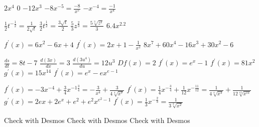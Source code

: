 \begin{Answer}[ref={exStandardDerivatives}]
	\Question %
\begin{tasks}
	\task $2 x^{4}$
	\task $0$
	\task $ -12 x^{3}$
	\task $ -8 x^{ -5} =\frac{ -8}{x^{5}}$
	\task $ -x^{ -4} =\frac{ -1}{x^{4}}$
\end{tasks}

\Question %
\begin{tasks}
	\task $\frac{1}{2} t^{ -\frac{1}{2}} =\frac{1}{2 \sqrt{t}}$
	\task $\frac{3}{2} t^{\frac{1}{2}} =\frac{3 \sqrt{t}}{2}$
	\task $\frac{5}{3} z^{\frac{2}{3}} =\frac{5 \sqrt[{3}]{z^{2}}}{3}$
	\task $6.4 x^{2.2}$ 
\end{tasks}

\Question %
\begin{tasks}
	\task $f^{ \prime } \left (x\right ) =6 x^{2} -6 x +4$
	\task $f^{ \prime } \left (x\right ) =2 x +1 -\frac{1}{x^{2}}$ 
	\task $8 x^{7} +60 x^{4} -16 x^{3} +30 x^{2} -6$
\end{tasks}

\Question 
\begin{tasks}
	\task $\frac{d s}{d t} =8 t -7$ 
	\task $\frac{d \left (3 x\right )}{d x} =3$ 
	\task $\frac{d \left (3 u^{4}\right )}{d u} =12 u^{3}$ 
	\task $D f \left (x\right ) =2$ 
	\task $f^{ \prime } \left (x\right ) =e^{x} -1$
	\task $f^{ \prime } \left (x\right ) =81 x^{2}$
	\task $g^{ \prime } \left (x\right ) =15 x^{14}$
	\task $f^{ \prime } \left (x\right ) =e^{x} -e x^{e -1}$ 
\end{tasks}

\Question %
\begin{tasks}
	\task $f^{ \prime } \left (x\right ) = -3 x^{ -4} +\frac{3}{4} x^{ -1\frac{3}{4}} = -\frac{3}{x^{4}} +\frac{3}{4 \sqrt[{4}]{x^{7}}}$
	\task $f^{ \prime } \left (x\right ) =\frac{1}{4} x^{ -\frac{3}{4}} +\frac{1}{12} x^{ -\frac{11}{12}} =\frac{1}{4 \sqrt[{4}]{x^{3}}} +\frac{1}{12 \sqrt[{12}]{x^{11}}}$ 
	\task $g^{ \prime } \left (x\right ) =2 e x +2 e^{x} +e^{2} +e^{2} x^{e^{2} -1}$
	\task $f^{ \prime } \left (x\right ) =\frac{1}{3} x^{ -\frac{2}{3}} =\frac{1}{3 \sqrt[{3}]{x^{2}}}$
\end{tasks}

\Question %
\begin{tasks}
	\task Check with Desmos
	\task Check with Desmos
	\task Check with Desmos
\end{tasks}


\end{Answer}
